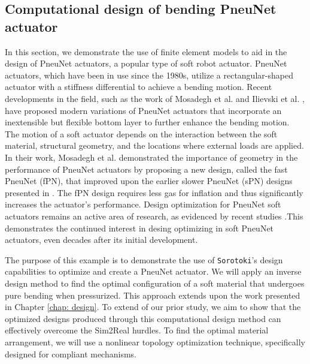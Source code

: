 \subsection{Computational design of bending PneuNet actuator}
In this section, we demonstrate the use of finite element models to aid in the design of PneuNet actuators, a popular type of soft robot actuator. PneuNet actuators, which have been in use since the 1980s, utilize a rectangular-shaped actuator with a stiffness differential to achieve a bending motion. Recent developments in the field, such as the work of Mosadegh et al. \cite{Mosadegh2014} and Ilievski et al. \cite{Ilievski2011Feb}, have proposed modern variations of PneuNet actuators that incorporate an inextensible but flexible bottom layer to further enhance the bending motion. The motion of a soft actuator depends on the interaction between the soft material, structural geometry, and the locations where external loads are applied. In their work, Mosadegh et al. \cite{Mosadegh2014} demonstrated the importance of geometry in the performance of PneuNet actuators by proposing a new design, called the fast PneuNet (fPN), that improved upon the earlier slower PneuNet (sPN) designs presented in \cite{Ilievski2011Feb}. The fPN design requires less gas for inflation and thus significantly increases the actuator's performance. Design optimization for PneuNet soft actuators remains an active area of research, as evidenced by recent studies \cite{Smith2022,Raeisinezhad2021May}.This demonstrates the continued interest in desing optimizing in soft PneuNet actuators, even decades after its initial development.

The purpose of this example is to demonstrate the use of \texttt{Sorotoki}'s design capabilities to optimize and create a PneuNet actuator. We will apply an inverse design method to find the optimal configuration of a soft material that undergoes pure bending when pressurized. This approach extends upon the work presented in Chapter \ref{chap: design}. To extend of our prior study, we aim to show that the optimized designs produced through this computational design method can effectively overcome the Sim2Real hurdles. To find the optimal material arrangement, we will use a nonlinear topology optimization technique, specifically designed for compliant mechanisms.

